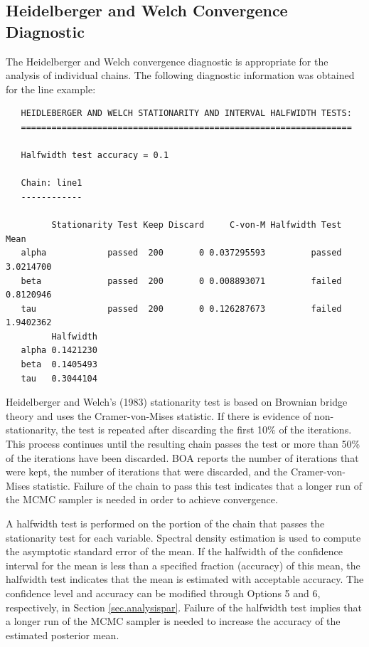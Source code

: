 \documentclass[12pt,letterpaper]{report}
\begin{document}
\subsection{Heidelberger and Welch Convergence Diagnostic}
\noindent
The Heidelberger and Welch convergence diagnostic is appropriate for the
analysis of individual chains. The following diagnostic information was obtained
for the line example:
\vskip 9pt
\begin{tiny}
\begin{verbatim}
   HEIDLEBERGER AND WELCH STATIONARITY AND INTERVAL HALFWIDTH TESTS:
   =================================================================

   Halfwidth test accuracy = 0.1

   Chain: line1
   ------------

         Stationarity Test Keep Discard     C-von-M Halfwidth Test      Mean
   alpha            passed  200       0 0.037295593         passed 3.0214700
   beta             passed  200       0 0.008893071         failed 0.8120946
   tau              passed  200       0 0.126287673         failed 1.9402362
         Halfwidth
   alpha 0.1421230
   beta  0.1405493
   tau   0.3044104
\end{verbatim}
\end{tiny}
Heidelberger and Welch's (1983) stationarity test is based on Brownian bridge
theory and uses the Cramer-von-Mises statistic. If there is evidence of
non-stationarity, the test is repeated after discarding the first 10\% of the
iterations. This process continues until the resulting chain passes the test or
more than 50\% of the iterations have been discarded. BOA reports the number of
iterations that were kept, the number of iterations that were discarded, and the
Cramer-von-Mises statistic. Failure of the chain to pass this test indicates
that a longer run of the MCMC sampler is needed in order to achieve
convergence.

A halfwidth test is performed on the portion of the chain that passes the
stationarity test for each variable. Spectral density estimation is used to
compute the asymptotic standard error of the mean. If the halfwidth of the
confidence interval for the mean is less than a specified fraction (accuracy) of
this mean, the halfwidth test indicates that the mean is estimated with
acceptable accuracy. The confidence level and accuracy can be modified through
Options 5 and 6, respectively, in Section \ref{sec.analysispar}. Failure of
the halfwidth test implies that a longer run of the MCMC sampler is needed to
increase the accuracy of the estimated posterior mean.
\end{document}
